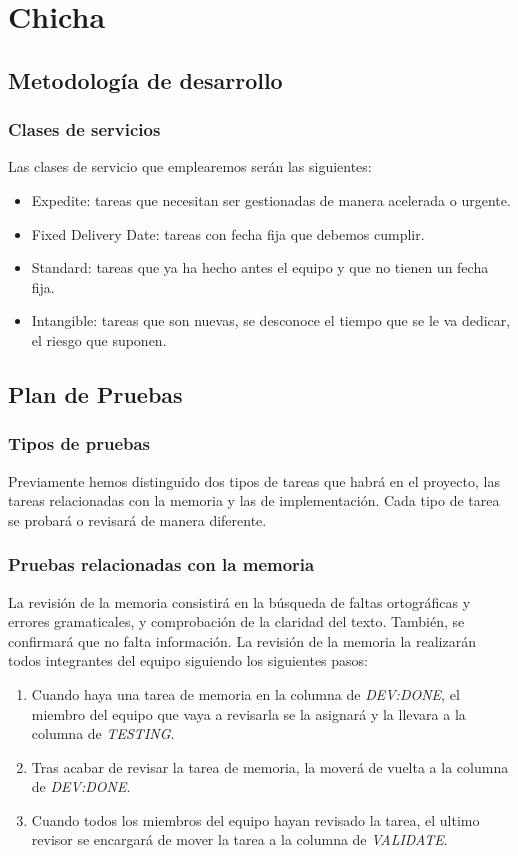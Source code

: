 \chapter{Chicha}
\label{cap:chicha}

\section{Metodología de desarrollo}
\subsection{Clases de servicios}
Las clases de servicio que emplearemos serán las siguientes:
\begin{itemize}
    \item Expedite: tareas que necesitan ser gestionadas de manera acelerada o urgente.  
    \item Fixed Delivery Date: tareas con fecha fija que debemos cumplir.
    \item Standard: tareas que ya ha hecho antes el equipo y que no tienen un fecha fija.
    \item Intangible: tareas que son nuevas, se desconoce el tiempo que se le va dedicar, el riesgo que suponen.
\end{itemize}

\section{Plan de Pruebas}
\nocite{pipelineRedHat}
\nocite{testingSW}
\nocite{ciAmazon}
\subsection{Tipos de pruebas}
Previamente hemos distinguido dos tipos de tareas que habrá en el proyecto, las tareas relacionadas con la memoria y las de implementación. Cada tipo de tarea se probará o revisará de manera diferente.
\subsection{Pruebas relacionadas con la memoria}
La revisión de la memoria consistirá en la búsqueda de faltas ortográficas y errores gramaticales, y comprobación de la claridad del texto. También, se confirmará que no falta información.
La revisión de la memoria la realizarán todos integrantes del equipo siguiendo los siguientes pasos:
\begin{enumerate}
    \item Cuando haya una tarea de memoria en la columna de \textit{DEV:DONE}, el miembro del equipo que vaya a revisarla se la asignará y la llevara a la columna de \textit{TESTING}.
    \item Tras acabar de revisar la tarea de memoria, la moverá de vuelta a la columna de \textit{DEV:DONE}.
    \item Cuando todos los miembros del equipo hayan revisado la tarea, el ultimo revisor se encargará de mover la tarea a la columna de \textit{VALIDATE}.
\end{enumerate}
